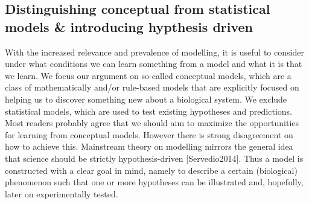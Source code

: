 \subsection{Distinguishing conceptual from statistical models \& introducing hypthesis driven}

With the increased relevance and prevalence of modelling, it is useful to consider under what conditions we can learn something from a model and what it is that we learn. We focus our argument on so-called conceptual models, which are a class of mathematically and/or rule-based models that are explicitly focused on helping us to discover something new about a biological system. We exclude statistical models, which are used to test existing hypotheses and predictions. Most readers probably agree that we should aim to maximize the opportunities for learning from conceptual models. However there is strong disagreement on how to achieve this. Mainstream theory on modelling mirrors the general idea that science should be strictly hypothesis-driven [Servedio2014]. Thus a model is constructed with a clear goal in mind, namely to describe a certain (biological) phenomenon such that one or more hypotheses can be illustrated and, hopefully, later on experimentally tested.
